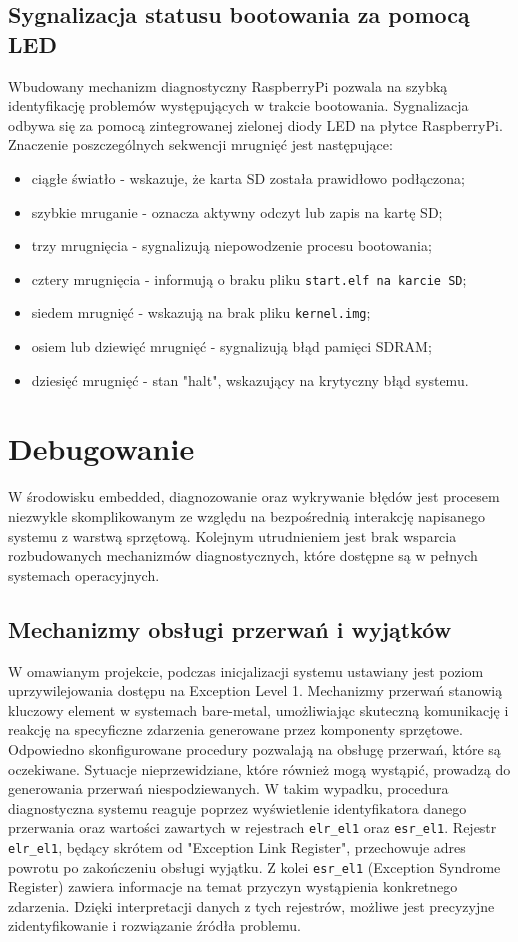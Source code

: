 \documentclass[shortabstract]{iithesis}
\begin{document}
\subsection{Sygnalizacja statusu bootowania za pomocą LED}
Wbudowany mechanizm diagnostyczny RaspberryPi pozwala na szybką identyfikację problemów występujących w trakcie bootowania. Sygnalizacja odbywa się za pomocą zintegrowanej zielonej diody LED na płytce RaspberryPi. Znaczenie poszczególnych sekwencji mrugnięć jest następujące:
\begin{itemize}
 \item ciągłe światło - wskazuje, że karta SD została prawidłowo podłączona;
 \item szybkie mruganie - oznacza aktywny odczyt lub zapis na kartę SD;
 \item trzy mrugnięcia - sygnalizują niepowodzenie procesu bootowania;
 \item cztery mrugnięcia - informują o braku pliku \texttt{start.elf na karcie SD};
 \item siedem mrugnięć - wskazują na brak pliku \texttt{kernel.img};
 \item osiem lub dziewięć mrugnięć - sygnalizują błąd pamięci SDRAM;
 \item dziesięć mrugnięć - stan "halt", wskazujący na krytyczny błąd systemu.
\end{itemize}

\section{Debugowanie}
W środowisku embedded, diagnozowanie oraz wykrywanie błędów jest procesem niezwykle skomplikowanym ze względu na bezpośrednią interakcję napisanego systemu z warstwą sprzętową. Kolejnym utrudnieniem jest brak wsparcia rozbudowanych mechanizmów diagnostycznych, które dostępne są w pełnych systemach operacyjnych. 
\subsection{Mechanizmy obsługi przerwań i wyjątków}
W omawianym projekcie, podczas inicjalizacji systemu ustawiany jest poziom uprzywilejowania dostępu na Exception Level 1. Mechanizmy przerwań stanowią kluczowy element w systemach bare-metal, umożliwiając skuteczną komunikację i reakcję na specyficzne zdarzenia generowane przez komponenty sprzętowe. Odpowiedno skonfigurowane procedury pozwalają na obsługę przerwań, które są oczekiwane. 
Sytuacje nieprzewidziane, które również mogą wystąpić, prowadzą do generowania przerwań niespodziewanych. W takim wypadku, procedura diagnostyczna systemu reaguje poprzez wyświetlenie identyfikatora danego przerwania oraz wartości zawartych w rejestrach \texttt{elr\_el1} oraz \texttt{esr\_el1}. Rejestr \texttt{elr\_el1}, będący skrótem od "Exception Link Register", przechowuje adres powrotu po zakończeniu obsługi wyjątku. Z kolei \texttt{esr\_el1} (Exception Syndrome Register) zawiera informacje na temat przyczyn wystąpienia konkretnego zdarzenia. Dzięki interpretacji danych z tych rejestrów, możliwe jest precyzyjne zidentyfikowanie i rozwiązanie źródła problemu.
\end{document}
